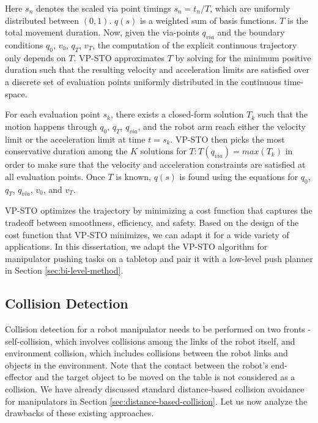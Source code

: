 Here $s_n$ denotes the scaled via point timings $s_n = t_n/T$, which are uniformly distributed between $(0,1)$. $q(s)$ is a weighted sum of basis functions. $T$ is the total movement duration. Now, given the via-points $q_{via}$ and the boundary conditions $q_0$, $v_0$, $q_T$, $v_T$, the computation of the explicit continuous trajectory only depends on $T$. VP-STO approximates $T$ by solving for the minimum positive duration such that the resulting velocity and acceleration limits are satisfied over a discrete set of evaluation points uniformly distributed in the continuous time-space. 

For each evaluation point $s_k$, there exists a closed-form solution $T_k$ such that the motion happens through $q_0$, $q_T$, $q_{via}$, and the robot arm reach either the velocity limit or the acceleration limit at time $t = s_k$. VP-STO then picks the most conservative duration among the $K$ solutions for $T: T(q_{via}) = max(T_k)$ in order to make sure that the velocity and acceleration constraints are satisfied at all evaluation points. Once $T$ is known, $q(s)$ is found using the equations for $q_0$, $q_T$, $q_{via}$, $v_0$, and $v_T$. 

VP-STO optimizes the trajectory by minimizing a cost function that captures the tradeoff between smoothness, efficiency, and safety. Based on the design of the cost function that VP-STO minimizes, we can adapt it for a wide variety of applications. In this dissertation, we adapt the VP-STO algorithm for manipulator pushing tasks on a tabletop and pair it with a low-level push planner in Section \ref{sec:bi-level-method}.

\subsection{Collision Detection}

Collision detection for a robot manipulator needs to be performed on two fronts - self-collision, which involves collisions among the links of the robot itself, and environment collision, which includes collisions between the robot links and objects in the environment. Note that the contact between the robot's end-effector and the target object to be moved on the table is not considered as a collision. We have already discussed standard distance-based collision avoidance for manipulators in Section \ref{sec:distance-based-collision}. Let us now analyze the drawbacks of these existing approaches. 

